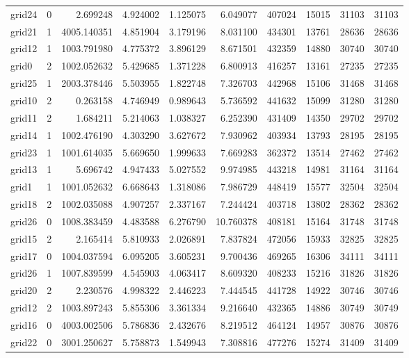 \begin{longtable}{|l|r|r|r|r|r|r|r|r|r|}
grid24 & 0 & 2.699248 & 4.924002 & 1.125075 & 6.049077 & 407024 & 15015 & 31103 & 31103 \\
grid21 & 1 & 4005.140351 & 4.851904 & 3.179196 & 8.031100 & 434301 & 13761 & 28636 & 28636 \\
grid12 & 1 & 1003.791980 & 4.775372 & 3.896129 & 8.671501 & 432359 & 14880 & 30740 & 30740 \\
grid0 & 2 & 1002.052632 & 5.429685 & 1.371228 & 6.800913 & 416257 & 13161 & 27235 & 27235 \\
grid25 & 1 & 2003.378446 & 5.503955 & 1.822748 & 7.326703 & 442968 & 15106 & 31468 & 31468 \\
grid10 & 2 & 0.263158 & 4.746949 & 0.989643 & 5.736592 & 441632 & 15099 & 31280 & 31280 \\
grid11 & 2 & 1.684211 & 5.214063 & 1.038327 & 6.252390 & 431409 & 14350 & 29702 & 29702 \\
grid14 & 1 & 1002.476190 & 4.303290 & 3.627672 & 7.930962 & 403934 & 13793 & 28195 & 28195 \\
grid23 & 1 & 1001.614035 & 5.669650 & 1.999633 & 7.669283 & 362372 & 13514 & 27462 & 27462 \\
grid13 & 1 & 5.696742 & 4.947433 & 5.027552 & 9.974985 & 443218 & 14981 & 31164 & 31164 \\
grid1 & 1 & 1001.052632 & 6.668643 & 1.318086 & 7.986729 & 448419 & 15577 & 32504 & 32504 \\
grid18 & 2 & 1002.035088 & 4.907257 & 2.337167 & 7.244424 & 403718 & 13802 & 28362 & 28362 \\
grid26 & 0 & 1008.383459 & 4.483588 & 6.276790 & 10.760378 & 408181 & 15164 & 31748 & 31748 \\
grid15 & 2 & 2.165414 & 5.810933 & 2.026891 & 7.837824 & 472056 & 15933 & 32825 & 32825 \\
grid17 & 0 & 1004.037594 & 6.095205 & 3.605231 & 9.700436 & 469265 & 16306 & 34111 & 34111 \\
grid26 & 1 & 1007.839599 & 4.545903 & 4.063417 & 8.609320 & 408233 & 15216 & 31826 & 31826 \\
grid20 & 2 & 2.230576 & 4.998322 & 2.446223 & 7.444545 & 441728 & 14922 & 30746 & 30746 \\
grid12 & 2 & 1003.897243 & 5.855306 & 3.361334 & 9.216640 & 432365 & 14886 & 30749 & 30749 \\
grid16 & 0 & 4003.002506 & 5.786836 & 2.432676 & 8.219512 & 464124 & 14957 & 30876 & 30876 \\
grid22 & 0 & 3001.250627 & 5.758873 & 1.549943 & 7.308816 & 477276 & 15274 & 31409 & 31409 \\

\end{longtable}
